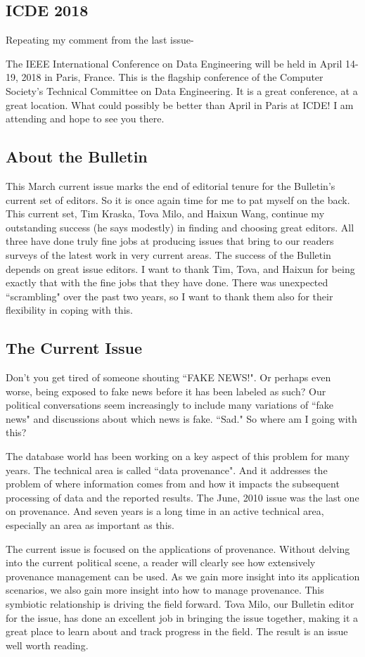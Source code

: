 \documentclass[11pt]{article}
\begin{document}
\subsection*{ICDE 2018}

Repeating my comment from the last issue-

The IEEE International Conference on Data Engineering will be held in April 14-19, 2018 in Paris, France.  This is the flagship conference of the Computer Society's Technical Committee on Data Engineering.  It is a great conference, at a great location.  What could possibly be better than April in Paris at ICDE!  I am attending and hope to see you there.

\subsection*{About the Bulletin}

This March current issue marks the end of editorial tenure for the Bulletin's current set of editors.  So it is once again time for me to pat myself on the back.  This current set, Tim Kraska, Tova Milo, and Haixun Wang, continue my outstanding success (he says modestly) in finding and choosing great editors.  All three have done truly fine jobs at producing issues that bring to our readers surveys of the latest work in very current areas. The success of the Bulletin depends on great issue editors.  I want to thank Tim, Tova, and Haixun for being exactly that with the fine jobs that they have done.  There was unexpected ``scrambling" over the past two years, so I want to thank them also for their flexibility in coping with this.  


\subsection*{The Current Issue}

Don't you get tired of someone shouting ``FAKE NEWS!".  Or perhaps even worse, being exposed to fake news before it has been labeled as such?  Our political conversations seem increasingly to include many variations of ``fake news" and discussions about which news is fake.  ``Sad." So where am I going with this?

The database world has been working on a key aspect of this problem for many years.  The technical area is called ``data provenance".  And it addresses the problem of where information comes from and how it impacts the subsequent processing of data and the reported results.  The June, 2010 issue was the last one on provenance.  And seven years is a long time in an active technical area, especially an area as important as this.

The current issue is focused on the applications of provenance.  Without delving into the current political scene, a reader will clearly see how extensively provenance management can be used.  As we gain more insight into its application scenarios, we also gain more insight into how to manage provenance.  This symbiotic relationship is driving the field forward.   Tova Milo, our Bulletin editor for the issue, has done an excellent job in bringing the issue together, making it a great place to learn about and track progress in the field.  The result is an issue well worth reading.
\end{document}
